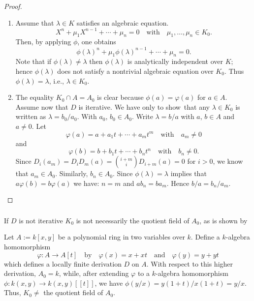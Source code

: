 \begin{proof}
\begin{enumerate}
\renewcommand{\labelenumi}{(\theenumi)}
\item Assume that $\lambda\in K$ satisfies an algebraic equation.
$$
X^{n}+\mu_{1}X^{n-1}+\cdots+\mu_{n}=0\quad\text{with}\quad
\mu_{1},\ldots,\mu_{n}\in K_{0}.
$$
Then, by applying $\phi$, one obtains
$$
\phi(\lambda)^{n}+\mu_{1}\phi(\lambda)^{n-1}+\cdots+\mu_{n}=0.
$$
Note that if $\phi(\lambda)\neq\lambda$ then $\phi(\lambda)$ is
analytically independent over $K$; hence $\phi(\lambda)$ does not
satisfy a nontrivial algebraic equation over $K_{0}$. Thus
$\phi(\lambda)=\lambda$, i.e., $\lambda\in K_{0}$.

\item The equality $K_{0}\cap A=A_{0}$ is clear because
  $\phi(a)=\varphi(a)$ for $a\in A$. Assume now that $D$ is
  iterative. We have only to show\pageoriginale\ that any $\lambda\in
  K_{0}$ is written as $\lambda=b_{0}/a_{0}$. With $a_{0}$, $b_{0}\in
  A_{0}$. Write $\lambda=b/a$ with $a$, $b\in A$ and $a\neq 0$. Let
$$
\varphi(a)=a+a_{1}t+\cdots+a_{m}t^{m}\quad\text{with}\quad a_{m}\neq 0
$$
and
$$
\varphi(b)=b+b_{1}t+\cdots+b_{n}t^{n}\quad\text{with}\quad b_{n}\neq
0.
$$
Since $D_{i}(a_{m})=D_{i}D_{m}(a)=\binom{i+m}{i}D_{i+m}(a)=0$ for
$i>0$, we know that $a_{m}\in A_{0}$. Similarly, $b_{n}\in
A_{0}$. Since $\phi(\lambda)=\lambda$ implies that
$a\varphi(b)=b\varphi(a)$ we have: $n=m$ and $ab_{n}=ba_{m}$. Hence
$b/a=b_{n}/a_{m}$.
\end{enumerate}
\end{proof}

\subsubsection{}\label{chap1:1.3.3}
If $D$ is not iterative $K_{0}$ is not necessarily the quotient field
of $A_{0}$, as is shown by

\begin{example*}
Let $A:=k[x,y]$ be a polynomial ring in two variables over $k$. Define
a $k$-algebra homomorphism
$$
\varphi:A\to A[t]\quad\text{by}\quad
\varphi(x)=x+xt\quad\text{and}\quad \varphi(y)=y+yt
$$
which defines a locally finite derivation $D$ on $A$. With respect to
this higher derivation, $A_{0}=k$, while, after extending $\varphi$ to
a $k$-algebra homomorphism $\phi:k(x,y)\to k(x,y)[[t]]$, we have
$\phi(y/x)=y(1+t)/x(1+t)=y/x$. Thus, $K_{0}\neq $ the quotient field
of $A_{0}$.
\end{example*}

